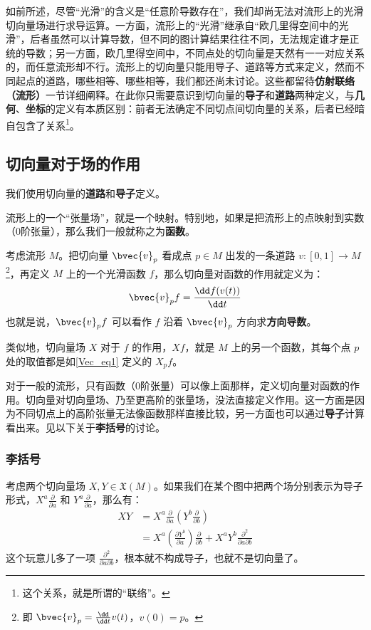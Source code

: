 如前所述，尽管“光滑”的含义是“任意阶导数存在”，我们却尚无法对流形上的光滑切向量场进行求导运算。一方面，流形上的“光滑”继承自“欧几里得空间中的光滑”，后者虽然可以计算导数，但不同的图计算结果往往不同，无法规定谁才是正统的导数；另一方面，欧几里得空间中，不同点处的切向量是天然有一一对应关系的，而任意流形却不行。流形上的切向量只能用导子、道路等方式来定义，然而不同起点的道路，哪些相等、哪些相等，我们都还尚未讨论。这些都留待\textbf{仿射联络（流形）}一节详细阐释。在此你只需要意识到切向量的\textbf{导子}和\textbf{道路}两种定义，与\textbf{几何}、\textbf{坐标}的定义有本质区别：前者无法确定不同切点间切向量的关系，后者已经暗自包含了关系\footnote{这个关系，就是所谓的“联络”。}。


\subsection{切向量对于场的作用}
我们使用切向量的\textbf{道路}和\textbf{导子}定义。

流形上的一个“张量场”，就是一个映射。特别地，如果是把流形上的点映射到实数（0阶张量），那么我们一般就称之为\textbf{函数}。

考虑流形 $M$。把切向量 $\bvec{v}_p$ 看成点 $p\in M$ 出发的一条道路 $v:[0, 1]\to M$\footnote{即 $\bvec{v}_p=\frac{\dd}{\dd t}v(t)$，$v(0)=p$。}，再定义 $M$ 上的一个光滑函数 $f$，那么切向量对函数的作用就定义为：
\begin{equation}\label{Vec_eq1}
\bvec{v}_pf=\frac{\dd f(v(t))}{\dd t}
\end{equation}
也就是说，$\bvec{v}_pf$ 可以看作 $f$ 沿着 $\bvec{v}_p$ 方向求\textbf{方向导数}。

类似地，切向量场 $X$ 对于 $f$ 的作用，$Xf$，就是 $M$ 上的另一个函数，其每个点 $p$ 处的取值都是如\autoref{Vec_eq1} 定义的 $X_p f$。

对于一般的流形，只有函数（0阶张量）可以像上面那样，定义切向量对函数的作用。切向量对切向量场、乃至更高阶的张量场，没法直接定义作用。这一方面是因为不同切点上的高阶张量无法像函数那样直接比较，另一方面也可以通过\textbf{导子}计算看出来。见以下关于\textbf{李括号}的讨论。

\subsubsection{李括号}

考虑两个切向量场 $X, Y\in\mathfrak{X}(M)$。如果我们在某个图中把两个场分别表示为导子形式，$X^a\frac{\partial}{\partial a}$ 和 $Y^a\frac{\partial}{\partial a}$，那么有：
\begin{equation}
\begin{aligned}
XY&=X^a\frac{\partial}{\partial a}(Y^b\frac{\partial}{\partial b})\\
&=X^a(\frac{\partial Y^b}{\partial a})\frac{\partial}{\partial b}+X^aY^b\frac{\partial^2}{\partial a\partial b}
\end{aligned}
\end{equation}
这个玩意儿多了一项 $\frac{\partial^2}{\partial a\partial b}$，根本就不构成导子，也就不是切向量了。

